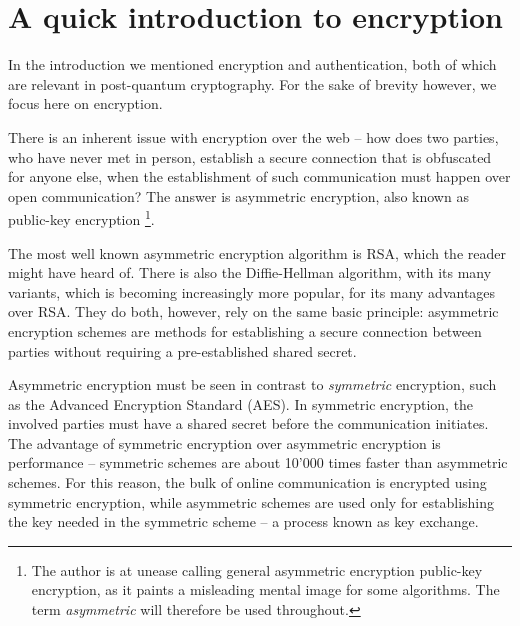 \documentclass[conference]{IEEEtran}
\begin{document}
\section{A quick introduction to encryption}
In the introduction we mentioned encryption and authentication, both of which are relevant in post-quantum cryptography.
For the sake of brevity however, we focus here on encryption.

There is an inherent issue with encryption over the web -- how does two parties, who have never met in person, establish a secure connection that is obfuscated for anyone else, when the establishment of such communication must happen over open communication?
The answer is asymmetric encryption, also known as public-key encryption
\footnote{The author is at unease calling general asymmetric encryption public-key encryption, as it paints a misleading mental image for some algorithms. The term \emph{asymmetric} will therefore be used throughout.}.

The most well known asymmetric encryption algorithm is RSA, which the reader might have heard of.
There is also the Diffie-Hellman algorithm, with its many variants, which is becoming increasingly more popular, for its many advantages over RSA\cite{cryptographyStallings}.
They do both, however, rely on the same basic principle: asymmetric encryption schemes are methods for establishing a secure connection between parties without requiring a pre-established shared secret.


Asymmetric encryption must be seen in contrast to \emph{symmetric} encryption, such as the Advanced Encryption Standard (AES).
In symmetric encryption, the involved parties must have a shared secret before the communication initiates.
The advantage of symmetric encryption over asymmetric encryption is performance -- symmetric schemes are about 10'000 times faster than asymmetric schemes.
For this reason, the bulk of online communication is encrypted using symmetric encryption, while asymmetric schemes are used only for establishing the key needed in the symmetric scheme -- a process known as key exchange.
\end{document}
